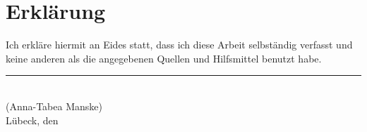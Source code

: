
\cleardoublepage
\thispagestyle{plain}
\vspace*{\fill}

\section*{Erklärung}

Ich erkläre hiermit an Eides statt, dass ich diese Arbeit selbständig verfasst und keine
anderen als die angegebenen Quellen und Hilfsmittel benutzt habe.

\vskip2cm

\rule{5cm}{0.4pt}\\
(Anna-Tabea Manske)\\
Lübeck, den \duedate